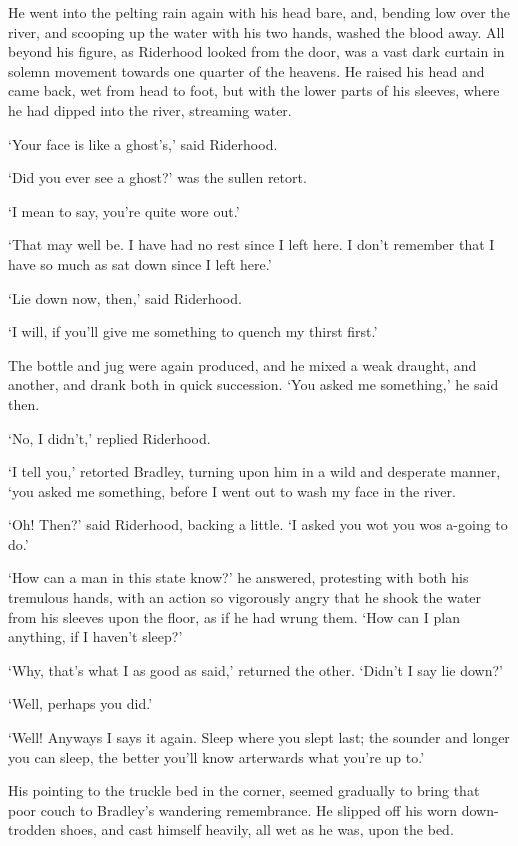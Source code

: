 He went into the pelting rain again with his head bare, and, bending low
over the river, and scooping up the water with his two hands, washed the
blood away. All beyond his figure, as Riderhood looked from the door,
was a vast dark curtain in solemn movement towards one quarter of the
heavens. He raised his head and came back, wet from head to foot, but
with the lower parts of his sleeves, where he had dipped into the river,
streaming water.

‘Your face is like a ghost’s,’ said Riderhood.

‘Did you ever see a ghost?’ was the sullen retort.

‘I mean to say, you’re quite wore out.’

‘That may well be. I have had no rest since I left here. I don’t
remember that I have so much as sat down since I left here.’

‘Lie down now, then,’ said Riderhood.

‘I will, if you’ll give me something to quench my thirst first.’

The bottle and jug were again produced, and he mixed a weak draught, and
another, and drank both in quick succession. ‘You asked me something,’
he said then.

‘No, I didn’t,’ replied Riderhood.

‘I tell you,’ retorted Bradley, turning upon him in a wild and desperate
manner, ‘you asked me something, before I went out to wash my face in
the river.

‘Oh! Then?’ said Riderhood, backing a little. ‘I asked you wot you wos
a-going to do.’

‘How can a man in this state know?’ he answered, protesting with both
his tremulous hands, with an action so vigorously angry that he shook
the water from his sleeves upon the floor, as if he had wrung them. ‘How
can I plan anything, if I haven’t sleep?’

‘Why, that’s what I as good as said,’ returned the other. ‘Didn’t I say
lie down?’

‘Well, perhaps you did.’

‘Well! Anyways I says it again. Sleep where you slept last; the sounder
and longer you can sleep, the better you’ll know arterwards what you’re
up to.’

His pointing to the truckle bed in the corner, seemed gradually to bring
that poor couch to Bradley’s wandering remembrance. He slipped off his
worn down-trodden shoes, and cast himself heavily, all wet as he was,
upon the bed.

